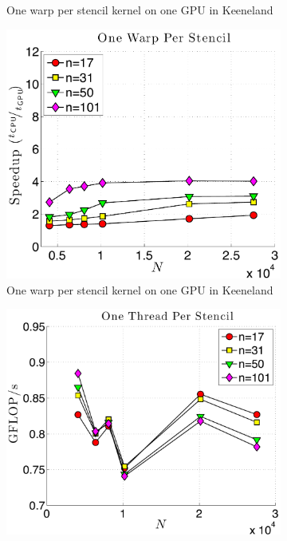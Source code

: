 \begin{figure}
\begin{subfigure}[t]{0.425\textwidth}
\caption{One warp per stencil kernel on one GPU in Keeneland}
\label{fig:gflops_gpu_1proc_oneWarp_keeneland}
\end{subfigure} 
\quad
\begin{subfigure}[t]{0.425\textwidth}
\includegraphics[width=\textwidth]{../figures/keeneland_results/alltoallv_cosine/speedup_1proc_oneWarpPerStencil.pdf}
\caption{One warp per stencil kernel on one GPU in Keeneland}
\label{fig:speedup_1proc_oneWarp_keeneland}
\end{subfigure} 
\begin{subfigure}[t]{0.425\textwidth}
\includegraphics[width=\textwidth]{../figures/keeneland_results/alltoallv_cosine/gflops_gpu_1proc_oneThreadPerStencil.pdf}

\end{subfigure}
\end{figure}
